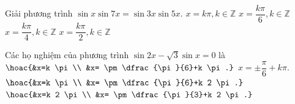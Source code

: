 \begin{ex}%
	Giải phương trình $\sin x\sin 7x=\sin 3x\sin  5x$.
	 \choice
		{$x=k\pi, k\in\mathbb{Z}$} 
		 {$x=\dfrac{k\pi}{6}, k\in\mathbb{Z}$}
		{\True $x=\dfrac{k\pi}{4}, k\in\mathbb{Z}$} 
		{$x=\dfrac{k\pi}{2},  k\in\mathbb{Z}$}
\end{ex}

\begin{ex}%
	Các họ nghiệm của phương trình $\sin 2 x-\sqrt{3}  \sin x=0$ là
	 \def\dotEX{}
	 \choice
		{\True $\hoac{&x=k \pi  \\ &x= \pm \dfrac{\pi}{6}+k \pi.}$}
		{$x= \pm \dfrac{\pi}{6}+k \pi.$} 
		{$\hoac{&x=k \pi \\ &x= \pm  \dfrac{\pi}{6}+k 2 \pi.}$}
		{$\hoac{&x=k 2 \pi \\ &x= \pm \dfrac{\pi}{3}+k  2 \pi.}$}
\end{ex}

